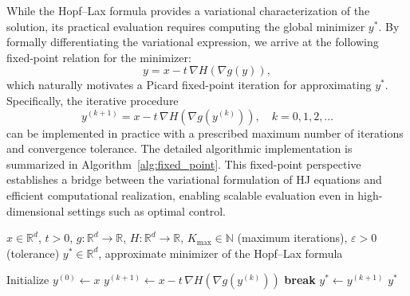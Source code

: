 \documentclass[review,hidelinks,onefignum,onetabnum]{siamart250106}
\begin{document}
While the Hopf--Lax formula provides a variational characterization of the solution, its practical evaluation requires computing the global minimizer \(y^*\). By formally differentiating the variational expression, we arrive at the following fixed-point relation for the minimizer:
\begin{equation}\label{eq:fixed_pts}
    y = x - t\, \nabla H(\nabla g(y)),
\end{equation}
which naturally motivates a Picard fixed-point iteration for approximating $y^*$. Specifically, the iterative procedure
\begin{equation}\label{eq:fp_iter}
    y^{(k+1)} = x - t\, \nabla H(\nabla g(y^{(k)})), \quad k = 0,1,2,\dots
\end{equation}
can be implemented in practice with a prescribed maximum number of iterations and convergence tolerance. The detailed algorithmic implementation is summarized in Algorithm~\ref{alg:fixed_point}. 
This fixed-point perspective establishes a bridge between the variational formulation of HJ equations and efficient computational realization, enabling scalable evaluation even in high-dimensional settings such as optimal control.

\begin{algorithm}[H]
\caption{Fixed-Point Iteration for Hamilton--Jacobi Equation}
\label{alg:fixed_point}
\begin{algorithmic}[1]
\REQUIRE $x \in \mathbb{R}^d$, $t>0$, $g:\mathbb{R}^d \to \mathbb{R}$, $H:\mathbb{R}^d \to \mathbb{R}$, 
$K_{\max} \in \mathbb{N}$ (maximum iterations), $\varepsilon > 0$ (tolerance)
\ENSURE $y^* \in \mathbb{R}^d$, approximate minimizer of the Hopf--Lax formula

\STATE Initialize $y^{(0)} \gets x$
    \STATE $y^{(k+1)} \gets x - t \, \nabla H(\nabla g(y^{(k)}))$
        \STATE \textbf{break}
    \ENDIF
\ENDFOR
\STATE $y^* \gets y^{(k+1)}$
\RETURN $y^*$
\end{algorithmic}
\end{algorithm}
\end{document}
